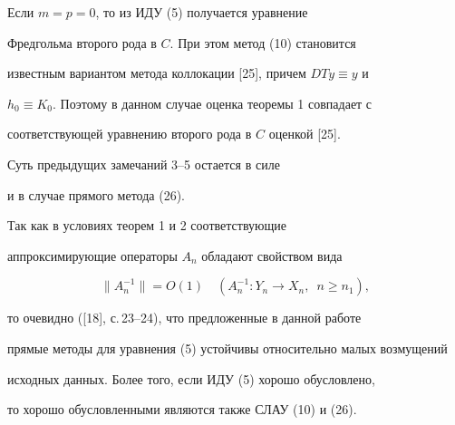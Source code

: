  


\begin{note} 


Если $m=p=0$, то из ИДУ (5) получается уравнение 


Фредгольма второго рода в $C$. При этом метод (10) становится 


известным вариантом метода коллокации [25], причем $D T y\equiv y$ и 


$h_0\equiv K_0$. Поэтому в данном случае оценка теоремы 1 совпадает с 


соответствующей уравнению второго рода в $C$ оценкой [25]. 


\end{note} 


 


\begin{note} 


Суть предыдущих замечаний 3--5 остается в силе 


и в случае прямого метода (26). 


\end{note} 


 


\begin{note} 


Так как в условиях теорем 1 и 2 соответствующие 


аппроксимирующие операторы $A_n$ обладают свойством вида 


$$ 


\|A^{-1}_n\|=O(1)\quad (A^{-1}_n:Y_n\to X_n,\ \; n\ge n_1), 


$$ 


то очевидно ([18], с.\,23--24), что предложенные в данной работе 


прямые методы для уравнения (5) устойчивы относительно малых возмущений 


исходных данных. Более того, если ИДУ (5) хорошо обусловлено, 


то хорошо обусловленными являются также СЛАУ (10) и (26). 


\end{note} 


 


